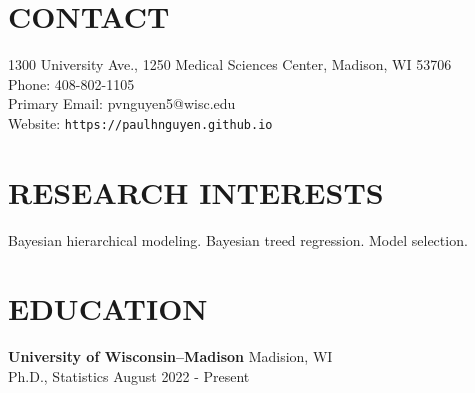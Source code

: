\documentclass[margin]{res}
\begin{document}
  
                        
\begin{resume}                        
  
  \section{CONTACT} 
  1300 University Ave., 1250 Medical Sciences Center, Madison, WI 53706 \\
  Phone: 408-802-1105 \\ 
  Primary Email: pvnguyen5@wisc.edu \\
  Website: \texttt{https://paulhnguyen.github.io}

  \section{RESEARCH INTERESTS}
  Bayesian hierarchical modeling. Bayesian treed regression. Model selection. 
              


              
\section{EDUCATION}      
                {\bf University of Wisconsin--Madison} \hfill Madision, WI \\
                Ph.D., Statistics \hfill August 2022 - Present \\
                

\end{resume}
\end{document}
